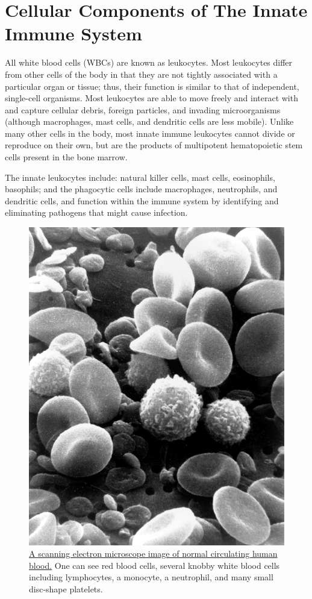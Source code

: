 \hypertarget{cellular-components-of-the-innate-immune-system}{%
\section{Cellular Components of The Innate Immune System}\label{cellular-components-of-the-innate-immune-system}}

All white blood cells (WBCs) are known as leukocytes. Most leukocytes differ from other cells of the body in that they are not tightly associated with a particular organ or tissue; thus, their function is similar to that of independent, single-cell organisms. Most leukocytes are able to move freely and interact with and capture cellular debris, foreign particles, and invading microorganisms (although macrophages, mast cells, and dendritic cells are less mobile). Unlike many other cells in the body, most innate immune leukocytes cannot divide or reproduce on their own, but are the products of multipotent hematopoietic stem cells present in the bone marrow.

The innate leukocytes include: natural killer cells, mast cells, eosinophils, basophils; and the phagocytic cells include macrophages, neutrophils, and dendritic cells, and function within the immune system by identifying and eliminating pathogens that might cause infection.



\begin{figure}

{\centering \includegraphics[width=0.7\linewidth]{./figures/immune/SEM_blood_cells} 

}

\caption{\href{https://commons.wikimedia.org/wiki/File:SEM_blood_cells.jpg}{A scanning electron microscope image of normal circulating human blood.} One can see red blood cells, several knobby white blood cells including lymphocytes, a monocyte, a neutrophil, and many small disc-shape platelets.}\label{fig:bloodcellsem}
\end{figure}

